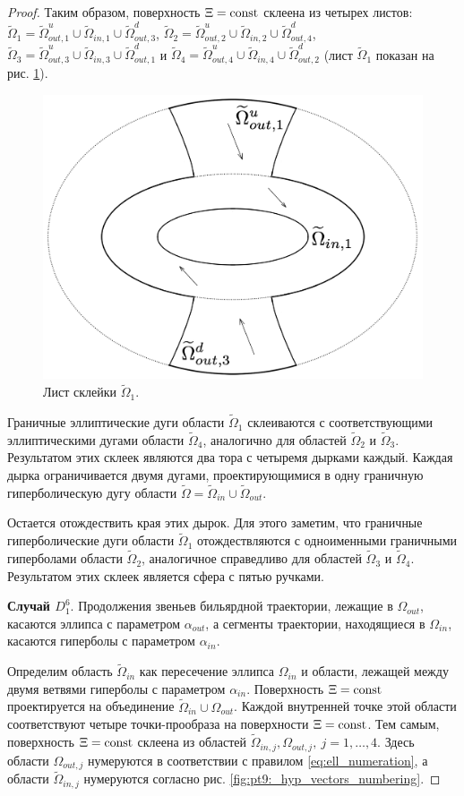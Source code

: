 \begin{proof}
Таким образом, поверхность $\Xi = \mathrm{const}$ склеена из четырех листов:
$\widetilde{\Omega}_1 = \widetilde{\Omega}_{out, 1}^u \cup \widetilde{\Omega}_{in, 1} \cup \widetilde{\Omega}_{out, 3}^d$, 
$\widetilde{\Omega}_2 = \widetilde{\Omega}_{out, 2}^u \cup \widetilde{\Omega}_{in, 2} \cup \widetilde{\Omega}_{out, 4}^d$, 
$\widetilde{\Omega}_3 = \widetilde{\Omega}_{out, 3}^u \cup \widetilde{\Omega}_{in, 3} \cup \widetilde{\Omega}_{out, 1}^d$ и 
 $\widetilde{\Omega}_4 = \widetilde{\Omega}_{out, 4}^u \cup \widetilde{\Omega}_{in, 4} \cup \widetilde{\Omega}_{out, 2}^d$ (лист $\widetilde{\Omega}_1$ показан на рис. \ref{fig:pt9:_hyp_page}).
 \begin{figure}[!htb]
 \centering
\includegraphics[width=0.4\linewidth]{images/section2/problems_vectors_2.pdf}
    \caption{Лист склейки $\widetilde{\Omega}_1$.}
    \label{fig:pt9:_hyp_page}
\end{figure}

 
Граничные эллиптические дуги области $\widetilde{\Omega}_1$  склеиваются с соответствующими эллиптическими дугами  области $\widetilde{\Omega}_4$, аналогично для областей $\widetilde{\Omega}_2$ и $\widetilde{\Omega}_3$. Результатом этих склеек являются два тора с четыремя дырками каждый. 
Каждая дырка ограничивается двумя дугами, проектирующимися в одну граничную гиперболическую дугу области $\widetilde{\Omega} = \widetilde{\Omega}_{in} \cup \widetilde{\Omega}_{out}$.

Остается отождествить края этих дырок. Для этого заметим, что граничные гиперболические дуги области $\widetilde{\Omega}_1$ отождествляются с одноименными граничными гиперболами области $\widetilde{\Omega}_2$, аналогичное справедливо для областей $\widetilde{\Omega}_3$ и $\widetilde{\Omega}_4$. Результатом этих склеек является сфера с пятью ручками. 

\textbf{Случай $D_1^6$}.
Продолжения звеньев бильярдной траектории, лежащие в $\Omega_{out}$, касаются эллипса с параметром $\alpha_{out}$, а сегменты траектории, находящиеся в $\Omega_{in}$, касаются гиперболы с параметром $\alpha_{in}$. 

Определим область $\widetilde{\Omega}_{in}$ как пересечение эллипса $\Omega_{in}$ и области, лежащей между двумя ветвями гиперболы с параметром $\alpha_{in}$.
Поверхность  $\Xi = \mathrm{const}$ проектируется на объединение $\widetilde{\Omega}_{in} \cup \Omega_{out}$. 
Каждой внутренней точке этой области соответствуют четыре точки-прообраза на поверхности $\Xi = \mathrm{const}$.
Тем самым, поверхность $\Xi = \mathrm{const}$ склеена из областей $\widetilde{\Omega}_{in, j}, \Omega_{out, j}, \ j=1,\ldots,4$.
Здесь области $\Omega_{out, j}$ нумеруются в соответствии с правилом \eqref{eq:ell_numeration}, а области $\widetilde{\Omega}_{in, j}$ нумеруются согласно рис. \ref{fig:pt9:_hyp_vectors_numbering}.



\end{proof}

